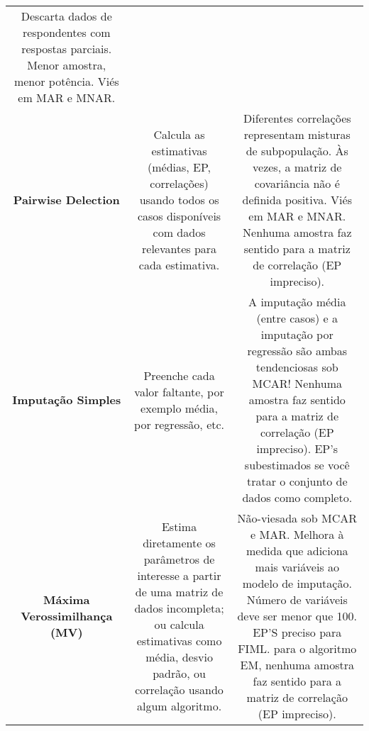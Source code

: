 \documentclass[
]{book}
\begin{document}
\begin{longtable}[]{@{}ccc@{}}
\begin{minipage}[t]{0.30\columnwidth}
Descarta dados de respondentes com respostas parciais. Menor amostra, menor potência. Viés em MAR e MNAR.\strut
\end{minipage}\tabularnewline
\begin{minipage}[t]{0.30\columnwidth}\centering
\textbf{Pairwise Delection}\strut
\end{minipage} & \begin{minipage}[t]{0.30\columnwidth}\centering
Calcula as estimativas (médias, EP, correlações) usando todos os casos disponíveis com dados relevantes para cada estimativa.\strut
\end{minipage} & \begin{minipage}[t]{0.30\columnwidth}\centering
Diferentes correlações representam misturas de subpopulação. Às vezes, a matriz de covariância não é definida positiva. Viés em MAR e MNAR. Nenhuma amostra faz sentido para a matriz de correlação (EP impreciso).\strut
\end{minipage}\tabularnewline
\begin{minipage}[t]{0.30\columnwidth}\centering
\textbf{Imputação Simples}\strut
\end{minipage} & \begin{minipage}[t]{0.30\columnwidth}\centering
Preenche cada valor faltante, por exemplo média, por regressão, etc.\strut
\end{minipage} & \begin{minipage}[t]{0.30\columnwidth}\centering
A imputação média (entre casos) e a imputação por regressão são ambas tendenciosas sob MCAR! Nenhuma amostra faz sentido para a matriz de correlação (EP impreciso). EP's subestimados se você tratar o conjunto de dados como completo.\strut
\end{minipage}\tabularnewline
\begin{minipage}[t]{0.30\columnwidth}\centering
\textbf{Máxima Verossimilhança (MV)}\strut
\end{minipage} & \begin{minipage}[t]{0.30\columnwidth}\centering
Estima diretamente os parâmetros de interesse a partir de uma matriz de dados incompleta; ou calcula estimativas como média, desvio padrão, ou correlação usando algum algoritmo.\strut
\end{minipage} & \begin{minipage}[t]{0.30\columnwidth}\centering
Não-viesada sob MCAR e MAR. Melhora à medida que adiciona mais variáveis ao modelo de imputação. Número de variáveis deve ser menor que 100. EP'S preciso para FIML. para o algoritmo EM, nenhuma amostra faz sentido para a matriz de correlação (EP impreciso).\strut

\end{minipage}
\end{longtable}
\end{document}
